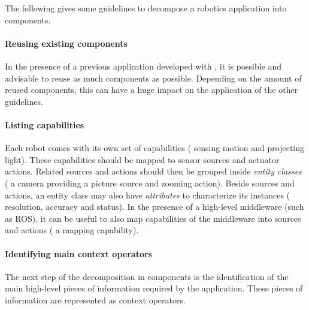 The following gives some guidelines to decompose a robotics
application into components.

\paragraph{Reusing existing components}
In the presence of a previous application developed with \diaspec{},
it is possible and advisable to reuse as much components as possible.
Depending on the amount of reused components, this can have a huge
impact on the application of the other guidelines.

\paragraph{Listing capabilities}
Each robot comes with its own set of capabilities (\eg{} sensing
motion and projecting light). These capabilities should be mapped to
sensor sources and actuator actions. Related sources and actions
should then be grouped inside \emph{entity classes} (\eg{} a camera
providing a picture source and zooming action). Beside sources and
actions, an entity class may also have \emph{attributes} to
characterize its instances (\eg{} resolution, accuracy and status). In
the presence of a high-level middleware (such as ROS), it can be
useful to also map capabilities of the middleware into sources and
actions (\eg{} a mapping capability).

\paragraph{Identifying main context operators}
The next step of the decomposition in components is the identification
of the main high-level pieces of information required by the
application. These pieces of information are represented as context
operators. %

